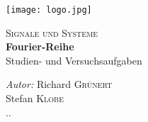 \documentclass[12pt]{article}
\begin{document}
\begin{titlepage}

\newcommand{\HRule}{\rule{\linewidth}{0.5mm}} %

\center %


\noindent\begin{minipage}[t][0.3819660112501052\paperheight][t]{\textwidth}
\centering
\vspace{0.09016994374947421\paperheight}
\texttt{[image: logo.jpg]}
\end{minipage}

\textsc{\Large Signale und Systeme}\\[0.5cm] %


{ \huge \bfseries Fourier-Reihe}\\ %
\vspace{0.034441853748633004\paperheight}
\large Studien- und Versuchsaufgaben\\
\vspace{0.1458980337503154\paperheight}


\emph{Autor:} Richard {\color{hsblue}\textsc{Grünert}}\\
		      Stefan {\color{hsblue}\textsc{Klobe}}\\
{\large {\the\day.\the\month.\the\year}}\\




\vfill %

\end{titlepage}
\end{document}
